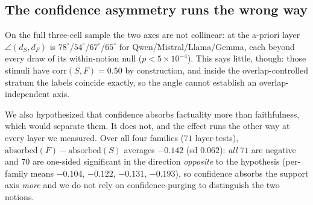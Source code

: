 \subsection{The confidence asymmetry runs the wrong way}
\label{sec:c2}
On the full three-cell sample the two axes are not collinear: at the a-priori layer
$\angle(d_S,d_F)$ is $78^\circ$/$54^\circ$/$67^\circ$/$65^\circ$ for
Qwen/Mistral/Llama/Gemma, each beyond every draw of its within-notion null
($p{<}5{\times}10^{-4}$). This says little, though: those stimuli have
$\mathrm{corr}(S,F){=}0.50$ by construction, and inside the overlap-controlled stratum
the labels coincide exactly, so the angle cannot establish an overlap-independent axis.

We also hypothesized that confidence absorbs factuality more than faithfulness, which
would separate them. It does not, and the effect runs the other way at every layer we
measured. Over all four families ($71$ layer-tests),
$\mathrm{absorbed}(F){-}\mathrm{absorbed}(S)$ averages $-0.142$ (sd $0.062$):
\emph{all} $71$ are negative and $70$ are one-sided significant in the direction
\emph{opposite} to the hypothesis (per-family means
$-0.104$, $-0.122$, $-0.131$, $-0.193$), so confidence absorbs the support axis
\emph{more} and we do not rely on confidence-purging to distinguish the two notions.

